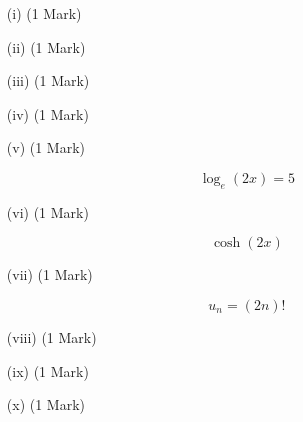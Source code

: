 


\begin{itemize}



\item[(i)](1 Mark)

\item[(ii)](1 Mark)

\item[(iii)](1 Mark)

\item[(iv)](1 Mark)




\item[(v)](1 Mark)

\[ \log_e (2x) = 5\]

\item[(vi)](1 Mark)

\[ \cosh(2x) \]

\item[(vii)](1 Mark)

\[u_n = (2n)! \]

\item[(viii)](1 Mark)

\item[(ix)](1 Mark)

\item[(x)](1 Mark)


\end{itemize}


